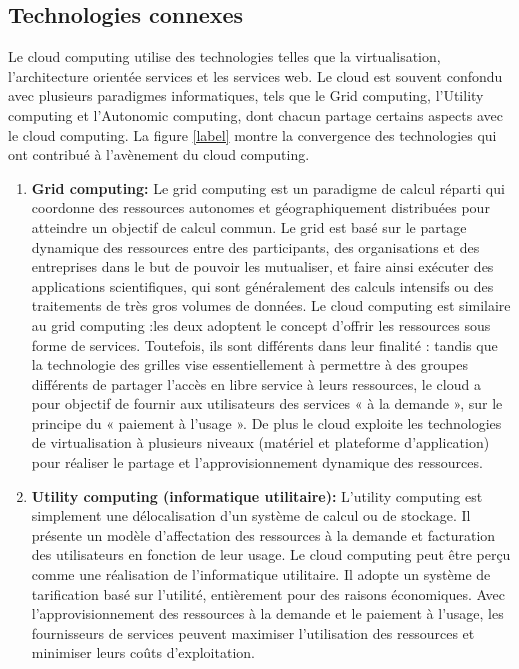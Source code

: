 \subsection{Technologies connexes }
Le cloud computing  utilise des technologies telles que la virtualisation, l'architecture orientée services et les services web. Le cloud est souvent confondu avec plusieurs paradigmes informatiques, tels que le Grid computing, l’Utility computing  et l’Autonomic computing, dont chacun partage certains aspects avec le cloud computing. La figure \ref{label} montre la convergence des technologies qui ont contribué à l'avènement du cloud computing. 
\begin{enumerate}
\item \textbf{Grid computing: }   Le grid computing  est un paradigme de calcul réparti qui coordonne des ressources autonomes et géographiquement distribuées pour atteindre un objectif de calcul commun. Le grid est basé sur le partage dynamique des ressources entre des participants, des organisations et des entreprises dans le but de pouvoir les mutualiser, et faire ainsi exécuter des applications scientifiques, qui sont généralement des calculs intensifs ou des traitements de très gros volumes de données. Le cloud computing  est similaire au grid computing :les deux adoptent le concept d’offrir les  ressources sous forme de services. Toutefois, ils sont différents dans leur finalité : tandis que la technologie des grilles vise essentiellement à permettre à des groupes différents de partager l’accès en libre service à leurs ressources, le cloud a pour objectif de fournir aux utilisateurs des services « à la demande », sur le principe du « paiement à l’usage ». De plus le cloud  exploite les technologies de virtualisation à plusieurs niveaux (matériel et plateforme d'application) pour réaliser le partage et l'approvisionnement dynamique des ressources.  
\item \textbf{Utility computing  (informatique utilitaire): } L’utility computing  est simplement une délocalisation d'un système de calcul ou de stockage. Il présente un modèle d’affectation des ressources à la demande et facturation des utilisateurs en fonction de leur usage. Le cloud computing  peut être perçu comme une réalisation de l'informatique utilitaire. Il adopte un système de tarification basé sur l'utilité, entièrement pour des raisons économiques. Avec l'approvisionnement des ressources à la demande et le paiement à l’usage, les fournisseurs de services peuvent maximiser l'utilisation des ressources et minimiser leurs coûts d'exploitation.


\end{enumerate}
